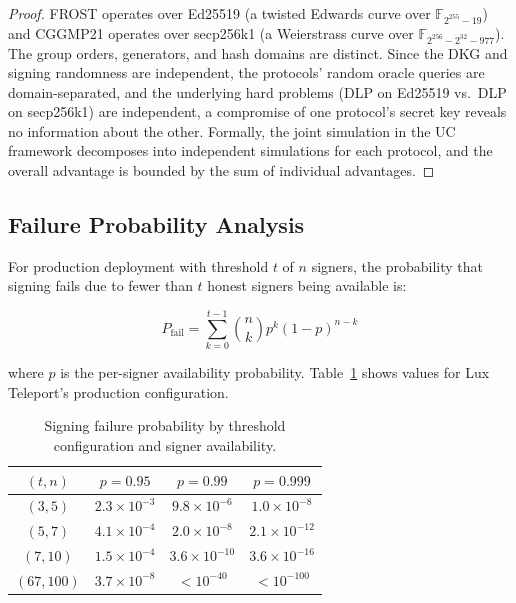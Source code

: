 \documentclass[11pt,twocolumn]{article}
\begin{document}
\begin{proof}
FROST operates over Ed25519 (a twisted Edwards curve over $\mathbb{F}_{2^{255}-19}$)
and CGGMP21 operates over secp256k1 (a Weierstrass curve over
$\mathbb{F}_{2^{256} - 2^{32} - 977}$). The group orders, generators, and hash
domains are distinct. Since the DKG and signing randomness are independent,
the protocols' random oracle queries are domain-separated, and the underlying hard
problems (DLP on Ed25519 vs.\ DLP on secp256k1) are independent, a compromise of one
protocol's secret key reveals no information about the other. Formally, the joint
simulation in the UC framework decomposes into independent simulations for each
protocol, and the overall advantage is bounded by the sum of individual advantages.
\end{proof}

\subsection{Failure Probability Analysis}

For production deployment with threshold $t$ of $n$ signers, the probability that
signing fails due to fewer than $t$ honest signers being available is:

\begin{equation}
\label{eq:failure}
P_{\text{fail}} = \sum_{k=0}^{t-1} \binom{n}{k} p^k (1-p)^{n-k}
\end{equation}

where $p$ is the per-signer availability probability. Table~\ref{tab:failure} shows
values for Lux Teleport's production configuration.

\begin{table}[H]
\centering
\small
\begin{tabular}{@{}cccc@{}}
\toprule
$(t, n)$ & $p = 0.95$ & $p = 0.99$ & $p = 0.999$ \\
\midrule
$(3, 5)$ & $2.3 \times 10^{-3}$ & $9.8 \times 10^{-6}$ & $1.0 \times 10^{-8}$ \\
$(5, 7)$ & $4.1 \times 10^{-4}$ & $2.0 \times 10^{-8}$ & $2.1 \times 10^{-12}$ \\
$(7, 10)$ & $1.5 \times 10^{-4}$ & $3.6 \times 10^{-10}$ & $3.6 \times 10^{-16}$ \\
$(67, 100)$ & $3.7 \times 10^{-8}$ & $<10^{-40}$ & $<10^{-100}$ \\
\bottomrule
\end{tabular}
\caption{Signing failure probability by threshold configuration and signer
availability.}
\label{tab:failure}
\end{table}
\end{document}
